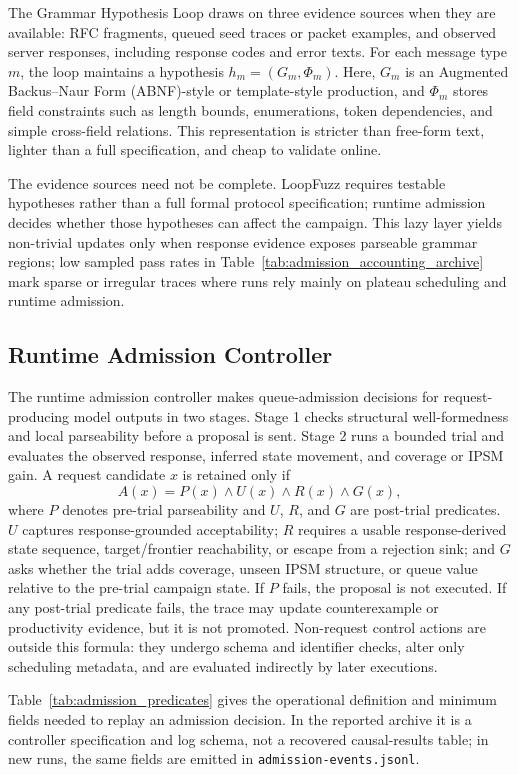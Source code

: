 \documentclass[final,5p,times,number]{elsarticle}
\begin{document}
The Grammar Hypothesis Loop draws on three evidence sources when they are available: RFC fragments, queued seed traces or packet examples, and observed server responses, including response codes and error texts. For each message type $m$, the loop maintains a hypothesis $h_m=(G_m,\Phi_m)$. Here, $G_m$ is an Augmented Backus--Naur Form (ABNF)-style or template-style production, and $\Phi_m$ stores field constraints such as length bounds, enumerations, token dependencies, and simple cross-field relations. This representation is stricter than free-form text, lighter than a full specification, and cheap to validate online.

The evidence sources need not be complete. LoopFuzz requires testable hypotheses rather than a full formal protocol specification; runtime admission decides whether those hypotheses can affect the campaign. This lazy layer yields non-trivial updates only when response evidence exposes parseable grammar regions; low sampled pass rates in Table~\ref{tab:admission_accounting_archive} mark sparse or irregular traces where runs rely mainly on plateau scheduling and runtime admission.

\subsection{Runtime Admission Controller}
The runtime admission controller makes queue-admission decisions for request-producing model outputs in two stages. Stage 1 checks structural well-formedness and local parseability before a proposal is sent. Stage 2 runs a bounded trial and evaluates the observed response, inferred state movement, and coverage or IPSM gain. A request candidate $x$ is retained only if
\[
A(x)=P(x) \land U(x) \land R(x) \land G(x),
\]
where $P$ denotes pre-trial parseability and $U$, $R$, and $G$ are post-trial predicates. $U$ captures response-grounded acceptability; $R$ requires a usable response-derived state sequence, target/frontier reachability, or escape from a rejection sink; and $G$ asks whether the trial adds coverage, unseen IPSM structure, or queue value relative to the pre-trial campaign state. If $P$ fails, the proposal is not executed. If any post-trial predicate fails, the trace may update counterexample or productivity evidence, but it is not promoted. Non-request control actions are outside this formula: they undergo schema and identifier checks, alter only scheduling metadata, and are evaluated indirectly by later executions.

Table~\ref{tab:admission_predicates} gives the operational definition and minimum fields needed to replay an admission decision. In the reported archive it is a controller specification and log schema, not a recovered causal-results table; in new runs, the same fields are emitted in \texttt{admission-events.jsonl}.
\end{document}
